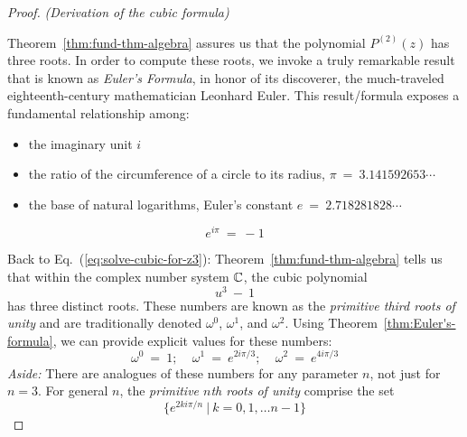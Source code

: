 \begin{proof} {\it (Derivation of the cubic formula)}
 

Theorem~\ref{thm:fund-thm-algebra} assures us that the polynomial $P^{(2)}(z)$ has three roots.  In order to compute these roots, we invoke a truly remarkable result that is known as  {\it Euler's Formula}, in honor of its discoverer, the much-traveled eighteenth-century mathematician Leonhard Euler.  This result/formula exposes a fundamental relationship among:
\begin{itemize}
\item
the imaginary unit  $i$
\medskip\item
the ratio of the circumference of a circle to its radius, $\pi \ = \ 3.141592653 \cdots$
\medskip\item
the base of natural logarithms, Euler's constant $e \ = \ 2.718281828 \cdots$
\end{itemize}

\begin{theorem}
\label{thm:Euler's-formula}
\[ e^{i \pi} \ = \ -1 \]
\end{theorem}

\smallskip

  
Back to Eq.~(\ref{eq:solve-cubic-for-z3}): Theorem~\ref{thm:fund-thm-algebra} tells us that within the complex number system $\mathbb{C}$, the cubic polynomial
\[ u^3 \ - \ 1 \]
has three distinct roots.  These numbers are known as the {\em primitive third roots of unity}  and are traditionally denoted $\omega^0$, $\omega^1$, and $\omega^2$.  Using Theorem~\ref{thm:Euler's-formula}, we can provide explicit values for these numbers:
\[ \omega^0 \ = \ 1; \ \ \ \ \
\omega^1 \ = \ e^{2i \pi/3}; \ \ \ \ \
\omega^2 \ = \ e^{4i \pi/3}
\]
{\em Aside:} There are analogues of these numbers for any parameter $n$, not just for $n=3$.  For general $n$, the {\it primitive $n$th roots of unity} comprise the set
\[ \{ e^{2ki \pi/n} \ | \ k = 0, 1, \ldots n-1\} \]

\medskip


\end{proof}
